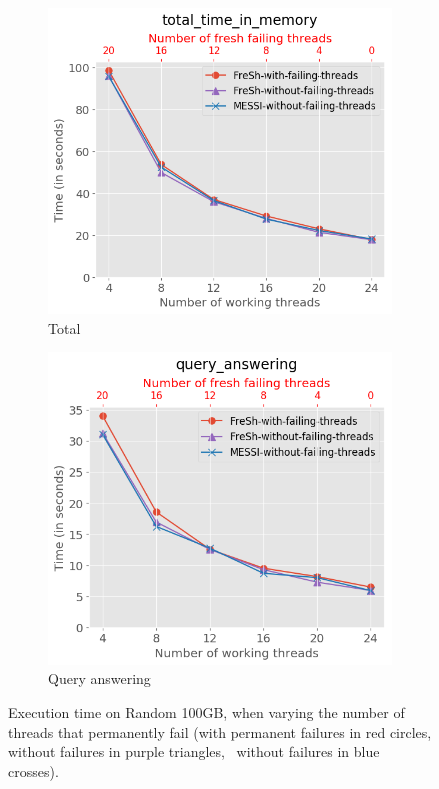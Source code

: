 \begin{figure}[htbp]
    \centering
    \begin{subfigure}{0.45\textwidth}  
        \includegraphics[width=\textwidth]{figures/Experiments/variable-num-failures-total}
        \caption{Total}
        \label{fig:eval:variable-num-failures:total}
    \end{subfigure}    
    \hfill
    \begin{subfigure}{0.45\textwidth}  
        \includegraphics[width=\textwidth]{figures/Experiments/variable-num-failures-query}
        \caption{Query answering}
        \label{fig:eval:variable-num-failures:queries}
    \end{subfigure}    
    \caption{Execution time on Random 100GB, when varying the number of threads that permanently fail 
    (\Fresh with permanent failures in red circles, \Fresh without failures in purple triangles, \MESSI\ without failures in blue crosses).}
    \label{fig:eval:variable-num-failures}
\end{figure}

